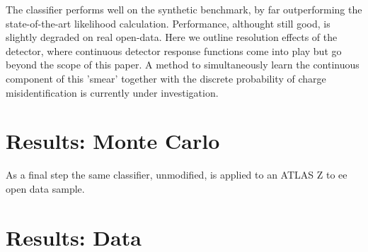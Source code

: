 The classifier performs well on the synthetic benchmark, by far outperforming the state-of-the-art likelihood calculation. Performance, althought still good, is slightly degraded on real open-data. Here we outline resolution effects of the detector, where continuous detector response functions come into play but go beyond the scope of this paper. A method to simultaneously learn the continuous component of this 'smear' together with the discrete probability of charge misidentification is currently under investigation. 

\section{Results: Monte Carlo}

As a final step the same classifier, unmodified, is applied to an ATLAS Z to ee open data sample.

\section{Results: Data}
